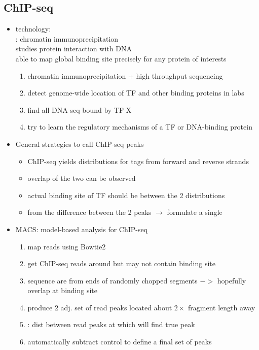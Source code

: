 \documentclass[font=12pt]{article}
\begin{document}
\subsection{ChIP-seq}
\begin{itemize}
	\item technology:\\
	: chromatin immunoprecipitation\\
	studies protein interaction with DNA\\
	able to map global binding site precisely for any protein of interests
		\begin{enumerate}
			\item chromatin immunoprecipitation + high throughput sequencing
			\item detect genome-wide location of TF and other binding proteins in labs
			\item find all DNA seq bound by TF-X
			\item try to learn the regulatory mechanisms of a TF or DNA-binding protein
		\end{enumerate}
	\item General strategies to call ChIP-seq peaks
		\begin{itemize}
			\item ChIP-seq yields distributions for tags from forward and reverse strands
			\item overlap of the two can be observed
			\item actual binding site of TF should be between the 2 distributions
			\item from the difference between the 2 peaks $\rightarrow$ formulate a single   
		\end{itemize}
	\item MACS: model-based analysis for ChIP-seq
	\begin{enumerate}
		\item map reads using Bowtie2
		\item get ChIP-seq reads around but may not contain binding site
		\item sequence are from ends of randomly chopped segments $->$ hopefully overlap at binding site
		\item produce 2 adj. set of read peaks located about $ 2\times $ fragment length away
		\item {}: dist between read peaks at which will find true peak
		\item automatically subtract control to define a final set of peaks

\end{enumerate}
\end{itemize}
\end{document}
